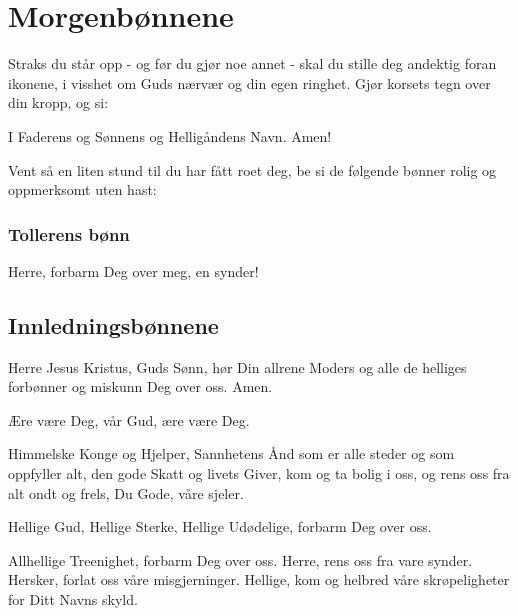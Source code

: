 \section{Morgenbønnene}

\begin{forklaring}
Straks du står opp - og før du gjør noe annet - skal du stille deg andektig foran ikonene, i visshet om Guds nærvær og din egen ringhet. Gjør korsets tegn over din kropp, og si:
\end{forklaring}

I Faderens og Sønnens og Helligåndens Navn. Amen!

\begin{forklaring}
Vent så en liten stund til du har fått roet deg, be si de følgende bønner rolig og oppmerksomt uten hast:
\end{forklaring}

\subsubsection{Tollerens bønn}

Herre, forbarm Deg over meg, en synder!

\subsection{Innledningsbønnene}

Herre Jesus Kristus, Guds Sønn, hør Din allrene Moders og alle de helliges forbønner og miskunn Deg over oss. Amen.

Ære være Deg, vår Gud, ære være Deg.

Himmelske Konge og Hjelper, Sannhetens Ånd som er alle steder og som oppfyller alt, den gode Skatt og livets Giver, kom og ta bolig i oss, og rens oss fra alt ondt og frels, Du Gode, våre sjeler.

Hellige Gud, Hellige Sterke, Hellige Udødelige, forbarm Deg over oss. 

Allhellige Treenighet, forbarm Deg over oss. Herre, rens oss fra vare synder. Hersker, forlat oss våre misgjerninger. Hellige, kom og helbred våre skrøpeligheter for Ditt Navns skyld.

